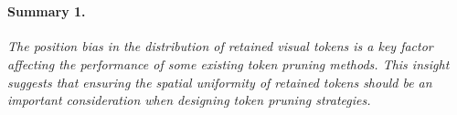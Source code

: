 

\vspace{-2mm}
\begin{takeaways}
\ \paragraph{Summary 1.} 
    \emph{The position bias in the distribution of retained visual tokens is a key factor affecting the performance of some existing token pruning methods. This insight suggests that ensuring the spatial uniformity of retained tokens should be an important consideration when designing token pruning strategies.}
\end{takeaways}

